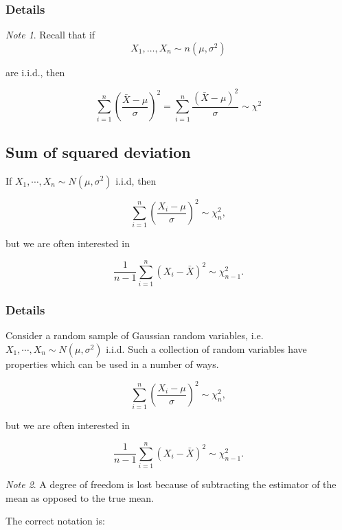 \documentclass[12pt,a4paper]{article}
\theoremstyle{regla}
\theoremstyle{remark}
\newtheorem{notes}{Note}[section]
\theoremstyle{definition}
\theoremstyle{nonumberbreak}
\begin{document}
\subsubsection{Details}
\begin{notes}
Recall that if 
$$ X_1, \ldots, X_n \sim n (\mu, \sigma^2)$$

 
are i.i.d., then 

$$\sum_{i=1}^n \left ( \frac {\bar{X} - \mu} {\sigma}\right ) ^2= \sum_{i=1}^n \frac {\left ( \bar{X} - \mu\right ) ^2} {\sigma}\sim \chi^2 $$
\end{notes}

\subsection{Sum of squared deviation}
\begin{fbox}
\begin{minipage}{0.97\textwidth}
If $X_1,\cdots,X_n \sim N(\mu,\sigma^2)$ i.i.d, then



$$\sum_{i=1}^n \left ( \frac{X_i-\mu}{\sigma} \right )^2 \sim \chi_{n}^2,$$

 but we are often interested in

$$\frac{1}{n-1}\sum_{i=1}^n (X_i-\bar{X})^2\sim \chi_{n-1}^2.$$

 

\end{minipage}
\end{fbox}
\subsubsection{Details}
Consider a random sample of Gaussian random variables, i.e. $X_1,\cdots,X_n \sim N(\mu,\sigma^2)$ i.i.d. Such a collection of random variables have properties which can be used in a number of ways.



$$\sum_{i=1}^n \left ( \frac{X_i-\mu}{\sigma} \right )^2 \sim \chi_{n}^2,$$

 but we are often interested in

$$\frac{1}{n-1}\sum_{i=1}^n (X_i-\bar{X})^2\sim \chi_{n-1}^2.$$

 

\begin{notes}
A degree of freedom is lost because of subtracting the estimator of the mean as opposed to the true mean. 
\end{notes}
The correct notation is:
\end{document}
